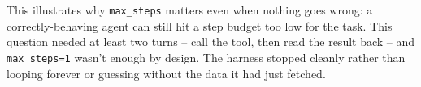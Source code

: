 \documentclass[11pt]{article}
\begin{document}
This illustrates why \verb|max_steps| matters even when nothing goes
wrong: a correctly-behaving agent can still hit a step budget too low for
the task. This question needed at least two turns -- call the tool, then
read the result back -- and \verb|max_steps=1| wasn't enough by design. The
harness stopped cleanly rather than looping forever or guessing without
the data it had just fetched.
\end{document}
